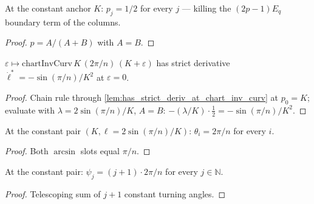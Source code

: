 \begin{lemma}
  \label{lem:jacobian_share_const}
  At the constant anchor $K$: $p_j = 1/2$ for every $j$ --- killing the
  $(2p-1)E_q$ boundary term of the columns.
\end{lemma}
\begin{proof}

\leanok
  $p = A/(A+B)$ with $A = B$.
\end{proof}

\begin{lemma}
  \label{lem:has_strict_deriv_at_two_level_len}
  $\varepsilon \mapsto \mathrm{chartInvCurv}\,K\,(2\pi/n)\,(K+\varepsilon)$
  has strict derivative $\dot\ell^* = -\sin(\pi/n)/K^2$ at $\varepsilon = 0$.
\end{lemma}
\begin{proof}

\leanok
  Chain rule through \cref{lem:has_strict_deriv_at_chart_inv_curv} at
  $p_0 = K$; evaluate with $\lambda = 2\sin(\pi/n)/K$, $A = B$:
  $-(\lambda/K)\cdot\tfrac12 = -\sin(\pi/n)/K^2$.
\end{proof}

\begin{lemma}
  \label{lem:turning_angle_const}
  At the constant pair $(K, \ell = 2\sin(\pi/n)/K)$:
  $\theta_i = 2\pi/n$ for every $i$.
\end{lemma}
\begin{proof}

\leanok
  Both $\arcsin$ slots equal $\pi/n$.
\end{proof}

\begin{lemma}
  \label{lem:heading_const}
  At the constant pair: $\psi_j = (j+1)\cdot 2\pi/n$ for every $j \in
  \mathbb{N}$.
\end{lemma}
\begin{proof}

\leanok
  Telescoping sum of $j+1$ constant turning angles.
\end{proof}

